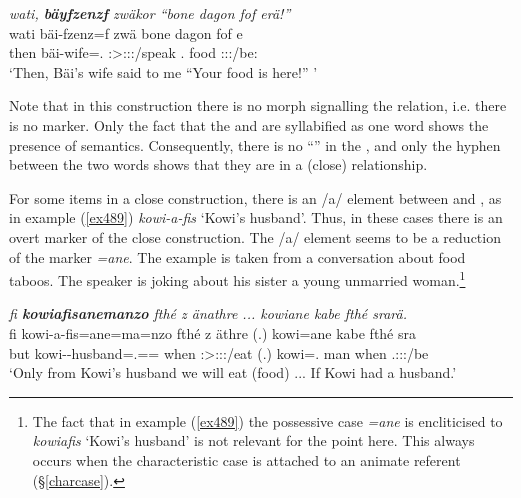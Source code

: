 \begin{exe}
	\ex \textit{wati, \textbf{bäyfzenzf} zwäkor ``bone dagon fof erä!''}\\
	\gll wati bäi-fzenz=f zwä bone dagon fof e\\
	then bäi-wife=\Erg.{\Sg} \Stsg:\Sbj>\Fsg{}:\Obj:\Rpst:\Pfv/speak \Ssg{}.{\Poss} food {\Emph} \Stpl:\Sbj:\Nonpast:\Ipfv/be:\\ 
	\trans `Then, Bäi's wife said to me ``Your food is here!'' '
	\label{ex450}
\end{exe}

Note that in this construction there is no morph signalling the  relation, i.e. there is no   marker. Only the fact that the  and  are syllabified as one word shows the presence of  semantics. Consequently, there is no ``'' in the , and only the hyphen between the two words shows that they are in a (close)  relationship.

For some items in a close  construction, there is an /a/ element between  and , as in example (\ref{ex489}) \emph{kowi-a-fis} `Kowi's husband'. Thus, in these cases there is an overt marker of the close  construction. The /a/ element seems to be a reduction of the   marker \emph{=ane}. The example is taken from a conversation about food taboos. The speaker is joking about his sister \textendash{} a young unmarried woman.\footnote{The fact that in example (\ref{ex489}) the possessive case \emph{=ane} is encliticised to \emph{kowiafis} `Kowi's husband' is not relevant for the point here. This always occurs when the characteristic case is attached to an animate referent ({\S}\ref{charcase}).}

\begin{exe}
	\ex \emph{fi \textbf{kowiafisanemanzo} fthé z änathre ... kowiane kabe fthé srarä.}\\
	\gll fi kowi-a-fis=ane=ma=nzo fthé z äthre (.) kowi=ane kabe fthé sra\\
	but kowi-\Poss-husband=\Poss.\Sg=\Char={\Only} when {\Iam} \Fpl:\Sbj>\Stpl:\Obj:\Nonpast:\Ipfv/eat (.) kowi=\Poss.{\Sg} man when \Tsg.\Masc:\Io:\Irr:\Ipfv/be\\
	\trans `Only from Kowi's husband we will eat (food) ... If Kowi had a husband.'\\
	\label{ex489}
\end{exe}

